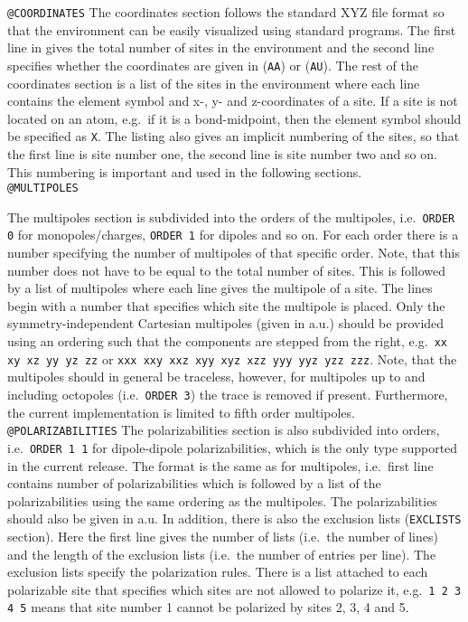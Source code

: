 \noindent\texttt{@COORDINATES}\newline
The coordinates section follows the standard XYZ file format so that the
environment can be easily visualized using standard programs. The first line in
gives the total number of sites in the environment and the second line
specifies whether the coordinates are given in \angstrom{} (\verb|AA|) or
\bohr{} (\verb|AU|). The rest of the coordinates section is a list of the sites in
the environment where each line contains the element symbol and x-, y- and
z-coordinates of a site. If a site is not located on an atom, e.g.\ if it is a
bond-midpoint, then the element symbol should be specified as \verb|X|. The
listing also gives an implicit numbering of the sites, so that the first line
is site number one, the second line is site number two and so on. This
numbering is important and used in the following sections.\\

\noindent\texttt{@MULTIPOLES}\newline

The multipoles section is subdivided into the orders of the
multipoles, i.e.\ \verb|ORDER 0| for monopoles/charges, \verb|ORDER 1|
for dipoles and so on.  For each order there is a number specifying
the number of multipoles of that specific order. Note, that this
number does not have to be equal to the total number of sites. This is
followed by a list of multipoles where each line gives the multipole
of a site. The lines begin with a number that specifies which site the
multipole is placed. Only the symmetry-independent Cartesian
multipoles (given in a.u.) should be provided using an ordering such
that the components are stepped from the right, e.g.\
\verb|xx xy xz yy yz zz| or \verb|xxx xxy xxz xyy xyz xzz yyy yyz yzz zzz|.
Note, that the multipoles should in general be traceless, however, for
multipoles up to and including octopoles (i.e.\ \verb|ORDER 3|) the
trace is removed if present. Furthermore,
the current implementation is limited to fifth order multipoles.\\

\noindent\texttt{@POLARIZABILITIES}\newline
The polarizabilities section is also subdivided into orders,
i.e.\ \verb|ORDER 1 1| for dipole-dipole polarizabilities, which is the only
type supported in the current release. The format is the same as for
multipoles, i.e.\ first line contains number of polarizabilities which is
followed by a list of the polarizabilities using the same ordering as the
multipoles. The polarizabilities should also be given in a.u. In addition,
there is also the exclusion lists (\verb|EXCLISTS|
section). Here the first line gives the number of lists (i.e.\ the number of
lines) and the length of the exclusion lists (i.e.\ the number of entries per
line). The exclusion lists specify the polarization rules. There is a list
attached to each polarizable site that specifies which sites are not allowed
to polarize it, e.g.\ \verb|1 2 3 4 5| means that site number 1 cannot be
polarized by sites 2, 3, 4 and 5.\\


